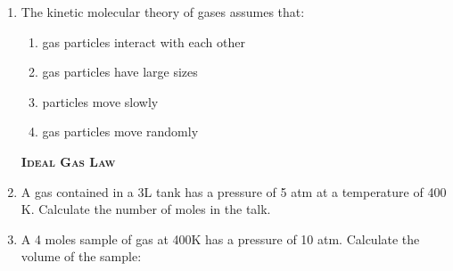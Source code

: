 \documentclass[main.tex]{subfiles}
\begin{document}
\begin{multicols*}{2}
\begin{enumerate}
\item The kinetic molecular theory of gases assumes that:
\begin{enumerate}[label=(\alph*)]
\item gas particles interact with each other
\item gas particles have large sizes
\item particles move slowly
\item gas particles move randomly
\end{enumerate}

{\raggedright\textsc{\textbf{Ideal Gas Law }}\par}


\item A gas contained in a 3L tank has a pressure of 5 atm at a temperature of 400 K.  Calculate the number of moles in the talk.
\begin{enumerate}[label=(\alph*)]
\end{enumerate}

\item A 4 moles sample of gas at 400K has a pressure of 10 atm. Calculate the volume of the sample:
\begin{enumerate}[label=(\alph*)]
\end{enumerate}



\end{enumerate}
\end{multicols*}
\end{document}
